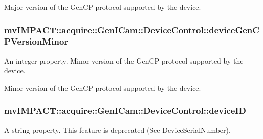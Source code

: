 Major version of the Gen\+C\+P protocol supported by the device. \hypertarget{classmv_i_m_p_a_c_t_1_1acquire_1_1_gen_i_cam_1_1_device_control_a40f7fb42f5891ef2e6dd5153c973a420}{
\subsubsection[{device\+Gen\+C\+P\+Version\+Minor}]{ mv\+I\+M\+P\+A\+C\+T\+::acquire\+::\+Gen\+I\+Cam\+::\+Device\+Control\+::device\+Gen\+C\+P\+Version\+Minor}}\label{classmv_i_m_p_a_c_t_1_1acquire_1_1_gen_i_cam_1_1_device_control_a40f7fb42f5891ef2e6dd5153c973a420}


An integer property. Minor version of the Gen\+C\+P protocol supported by the device. 

Minor version of the Gen\+C\+P protocol supported by the device. \hypertarget{classmv_i_m_p_a_c_t_1_1acquire_1_1_gen_i_cam_1_1_device_control_aadf1acdf754bef2f96225897e8982987}{
\subsubsection[{device\+I\+D}]{ mv\+I\+M\+P\+A\+C\+T\+::acquire\+::\+Gen\+I\+Cam\+::\+Device\+Control\+::device\+I\+D}}\label{classmv_i_m_p_a_c_t_1_1acquire_1_1_gen_i_cam_1_1_device_control_aadf1acdf754bef2f96225897e8982987}


A string property. This feature is deprecated (See Device\+Serial\+Number). 

